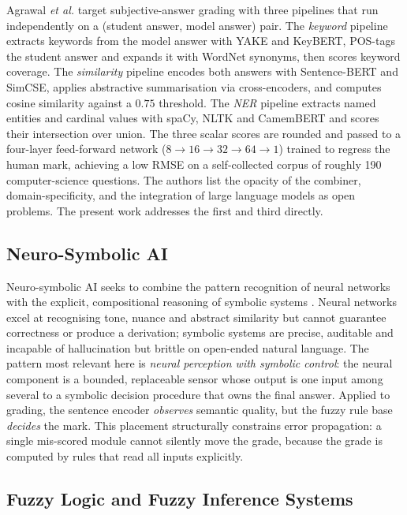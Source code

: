 \documentclass[11pt,a4paper]{article}
\begin{document}
Agrawal \emph{et al.} \cite{agrawal2024} target subjective-answer grading with
three pipelines that run independently on a (student answer, model answer) pair.
The \emph{keyword} pipeline extracts keywords from the model answer with YAKE and
KeyBERT, POS-tags the student answer and expands it with WordNet synonyms, then
scores keyword coverage. The \emph{similarity} pipeline encodes both answers with
Sentence-BERT and SimCSE, applies abstractive summarisation via cross-encoders,
and computes cosine similarity against a $0.75$ threshold. The \emph{NER}
pipeline extracts named entities and cardinal values with spaCy, NLTK and
CamemBERT and scores their intersection over union. The three scalar scores are
rounded and passed to a four-layer feed-forward network ($8\!\rightarrow\!16
\!\rightarrow\!32\!\rightarrow\!64\!\rightarrow\!1$) trained to regress the human
mark, achieving a low RMSE on a self-collected corpus of roughly 190
computer-science questions. The authors list the opacity of the combiner,
domain-specificity, and the integration of large language models as open
problems. The present work addresses the first and third directly.

\subsection{Neuro-Symbolic AI}

Neuro-symbolic AI seeks to combine the pattern recognition of neural networks
with the explicit, compositional reasoning of symbolic systems
\cite{garcez2023}. Neural networks excel at recognising tone, nuance and abstract
similarity but cannot guarantee correctness or produce a derivation; symbolic
systems are precise, auditable and incapable of hallucination but brittle on
open-ended natural language. The pattern most relevant here is \emph{neural
perception with symbolic control}: the neural component is a bounded, replaceable
sensor whose output is one input among several to a symbolic decision procedure
that owns the final answer. Applied to grading, the sentence encoder
\emph{observes} semantic quality, but the fuzzy rule base \emph{decides} the mark.
This placement structurally constrains error propagation: a single mis-scored
module cannot silently move the grade, because the grade is computed by rules that
read all inputs explicitly.

\subsection{Fuzzy Logic and Fuzzy Inference Systems}
\end{document}
